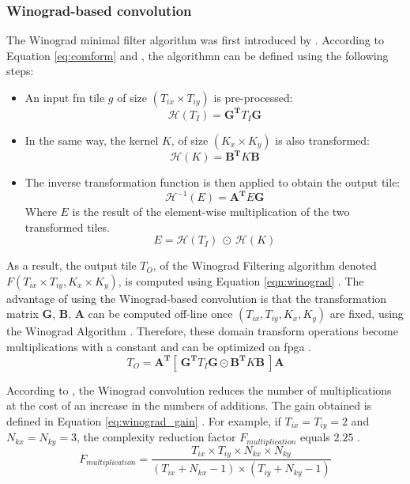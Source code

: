 \subsubsection{Winograd-based convolution}
%
The Winograd minimal filter algorithm was first introduced by \cite{winograd_arithmetic_1980}. According to Equation \eqref{eq:comform} and \textcite{abdelouahab_accelerating_2018}, the algorithmn can be defined using the following steps:
\begin{itemize}
    \item An input \acrshort{fm} tile $g$ of size $(T_{ix} \times T_{iy})$ is pre-processed: $$\mathcal{H}(T_I) = \boldsymbol{G^{T}} T_I \boldsymbol{G} $$
    \item In the same way, the kernel $K$, of size $(K_x \times K_y)$ is also transformed: $$\mathcal{H}(K) = \boldsymbol{B^{T}} K \boldsymbol{B}$$
    \item The inverse transformation function is then applied to obtain the output tile: $$\mathcal{H}^{-1}(E) = \boldsymbol{A^{T}} E \boldsymbol{G}$$ Where $E$ is the result of the element-wise multiplication of the two transformed tiles. $$ E = \mathcal{H}(T_I) \ \odot \ \mathcal{H}(K) $$
\end{itemize}
As a result, the output tile $T_O$, of the Winograd Filtering algorithm denoted $F(T_{ix} \times T_{iy}, K_x \times K_y)$, is computed using Equation \eqref{eqn:winograd} \cite{winograd_arithmetic_1980}. The advantage of using the Winograd-based convolution is that the transformation matrix $\boldsymbol{G}$, $\boldsymbol{B}$, $\boldsymbol{A}$ can be computed off-line once $(T_{ix}, T_{iy}, K_x, K_y)$ are fixed, using the Winograd Algorithm \cite{winograd_arithmetic_1980}. Therefore, these domain transform operations become multiplications with a constant and can be optimized on \acrshort{fpga} \cite{liang_evaluating_2020}.
%
\begin{equation}
    T_O = \boldsymbol{A^{T}} [ \ \boldsymbol{G^{T}} T_I \boldsymbol{G} \odot \boldsymbol{B^{T}} K\boldsymbol{B} \ ] \boldsymbol{A}
    \label{eqn:winograd}
\end{equation}

According to \textcite{winograd_arithmetic_1980}, the Winograd convolution reduces the number of multiplications at the cost of an increase in the numbers of additions. The gain obtained is defined in Equation \eqref{eq:winograd_gain} \cite{winograd_arithmetic_1980}. For example, if $T_{ix} = T_{iy} = 2$ and $N_{kx} = N_{ky} = 3$, the complexity reduction factor $F_{multiplication}$ equals $2.25$ \cite{lavin_fast_2016}.
%
\begin{equation}
    F_{multiplication} = \frac{T_{ix} \times T_{iy} \times N_{kx} \times N_{ky}}{(T_{ix} + N_{kx} - 1) \times (T_{iy} + N_{ky} - 1)}
    \label{eq:winograd_gain}
\end{equation}
%
